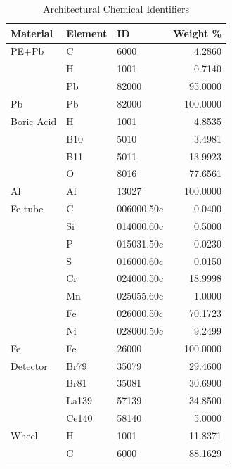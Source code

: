 \documentclass[preprint, 12pt, authoryear]{elsarticle}
\begin{document}
\begin{table}[H]
    \centering
    \caption{Architectural Chemical Identifiers}
    \begin{tabular}{lllr}
    \hline
    Material   & Element   & ID         &   Weight \% \\
    \hline
    PE+Pb      & C         & 6000       &     4.2860 \\
                & H         & 1001       &     0.7140 \\
                & Pb        & 82000      &    95.0000 \\
    \hline
    Pb         & Pb        & 82000      &   100.0000 \\
    \hline
    Boric Acid & H         & 1001       &     4.8535 \\
                & B10       & 5010       &     3.4981 \\
                & B11       & 5011       &    13.9923 \\
                & O         & 8016       &    77.6561 \\
    \hline
    Al         & Al        & 13027      &   100.0000 \\
    \hline
    Fe-tube    & C         & 006000.50c &     0.0400 \\
                & Si        & 014000.60c &     0.5000 \\
                & P         & 015031.50c &     0.0230 \\
                & S         & 016000.60c &     0.0150 \\
                & Cr        & 024000.50c &    18.9998 \\
                & Mn        & 025055.60c &     1.0000 \\
                & Fe        & 026000.50c &    70.1723 \\
                & Ni        & 028000.50c &     9.2499 \\
    \hline
    Fe         & Fe        & 26000      &   100.0000 \\
    \hline
    Detector   & Br79      & 35079      &    29.4600 \\
                & Br81      & 35081      &    30.6900 \\
                & La139     & 57139      &    34.8500 \\
                & Ce140     & 58140      &     5.0000 \\
    \hline
    Wheel      & H         & 1001       &    11.8371 \\
                & C         & 6000       &    88.1629 \\
    \hline
    \end{tabular}
    \label{tab:arch_identifiers}
\end{table}
\end{document}
